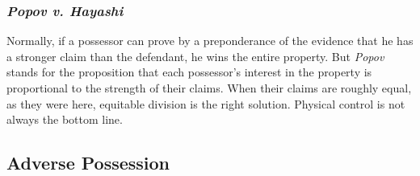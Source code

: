 \subsubsection{\emph{Popov v. Hayashi}} 

Normally, if a possessor can prove by a preponderance of the evidence that he 
has a stronger claim than the defendant, he wins the entire property. But 
\emph{Popov} stands for the proposition that each possessor's interest in the 
property is proportional to the strength of their claims. When their claims are 
roughly equal, as they were here, equitable division is the right solution. 
Physical control is not always the bottom line.

\subsection{Adverse Possession}

